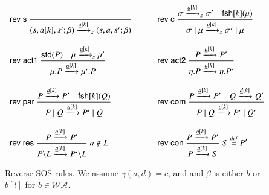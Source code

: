 {\begin{figure}[t]
\[
\begin{array}{ll}
\rulename{rev s}\ 
\Rule
{
}
{(s,a[k],s';\beta) \xrightarrow{\underline{a}[k]}_s (s,a,s';\beta)}
\qquad &
\rulename{rev c}\
\Rule
{\sigma \xrightarrow{\underline{a}[k]}_s \sigma'\quad \fresh{k}{\mu}}
{\sigma \paral \mu \xrightarrow{\underline{a}[k]}_s \sigma' \paral \mu}
\\[25pt]
%
\rulename{rev act1}\
\Rule
{\std{P} %
\quad \mu \xrightarrow{\underline{a}[k]}_s \mu' }
{\mu.P \xrightarrow{\underline{a}[k]}\mu'.P}
\quad &
%
%
%
\rulename{rev act2}\
\Rule
{P \xrightarrow{\underline{a}[k]} P' %
}
{\eta.P \xrightarrow{\underline{a}[k]} \eta.P'}
\\[25pt]
\rulename{rev par}\
\Rule
{P \xrightarrow{\underline{a}[k]} P'\quad \fresh{k}{Q}}
{P \paral Q \xrightarrow{\underline{a}[k]} P' \paral Q}
\quad &
\rulename{rev com}\
\Rule
{P \xrightarrow{\underline{a}[k]} P' \quad Q \xrightarrow{\underline{d}[k]} Q'}
{P \paral Q \xrightarrow{\underline{c}[k]} P' \paral Q'}
%
\\[25pt]
\rulename{rev res}\
\Rule
{P \xrightarrow{\underline{a}[k]} P'}
{P\backslash L \xrightarrow{\underline{a}[k]} P'\backslash L}
\; a \notin L
\quad &
\rulename{rev con}\
\Rule
{P \xrightarrow{\underline{a}[k]} P'}
{P \xrightarrow{\underline{a}[k]} S}
\; S \bydef P'
\end{array}
\]
\caption{Reverse SOS rules. We assume $\gamma(a,d)=c$, and 
and $\beta$ is either $b$ or $b[l]$ for $b \in \mathcal{WA}$. %
} 
\label{fig:reversesos}
\end{figure}

}
